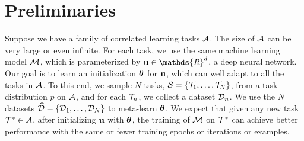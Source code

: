 \section{Preliminaries}\label{sect:bg}
Suppose we have a family of correlated learning tasks $\mathcal{A} $. The size of $\mathcal{A}$ can be very large or even infinite. For each task, we use the same machine learning model ${\mathcal{M}}$, which is parameterized by $\u \in \mathds{R}^d$, \eg a deep neural network. Our goal is to learn an initialization $\boldsymbol{\theta}$  for ${\bf u}$, which can well adapt to all the tasks in $\mathcal{A}$. To this end, we sample $N$ tasks, $\mathcal{S} = \{\mathcal{T}_{1}, \ldots, \mathcal{T}_{N}\}$, from a task distribution $p$ on $\mathcal{A}$, and for each $\mathcal{T}_{n}$, we collect a dataset $\mathcal{D}_n$. We use the $N$ datasets $\widehat{\mathcal{D}} = \{\mathcal{D}_1, \ldots, \mathcal{D}_N\}$ to meta-learn $\boldsymbol{\theta}$. We expect that given any new task $\mathcal{T}^* \in \mathcal{A}$, after initializing  ${\bf u}$ with $\boldsymbol{\theta}$, the training of ${\mathcal{M}}$ on $\mathcal{T}^{*}$ can achieve better performance with the same or fewer training epochs or iterations or examples.

